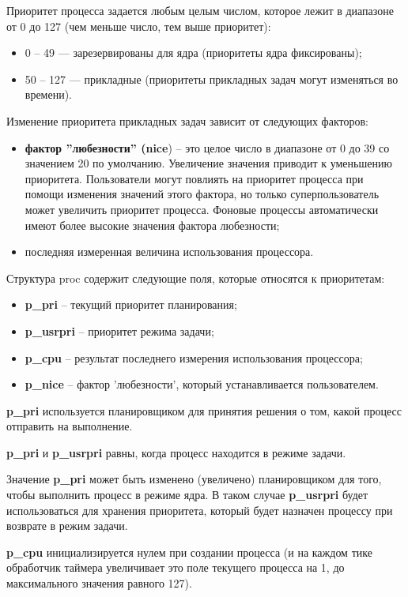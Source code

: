 \documentclass[a4paper,14pt,russian]{extreport}
\begin{document}
	Приоритет процесса задается любым целым числом, которое лежит в диапазоне от 0 до 127 (чем меньше число, тем выше приоритет):
	\begin{itemize}
		\item 0 -- 49 --- зарезервированы для ядра (приоритеты ядра фиксированы);
		\item 50 -- 127 --- прикладные (приоритеты прикладных задач могут изменяться во времени).
	\end{itemize}
	
	Изменение приоритета прикладных задач зависит от следующих факторов:
	\begin{itemize}
		\item \textbf{фактор ”любезности” (nice}) – это целое число в диапазоне от 0 до 39 со значением 20 по умолчанию.
		Увеличение значения приводит к уменьшению приоритета.
		Пользователи могут повлиять на приоритет процесса при помощи изменения значений этого фактора, но только суперпользователь может увеличить приоритет процесса.
		Фоновые процессы автоматически имеют более высокие значения фактора любезности;
		\item последняя измеренная величина использования процессора.
	\end{itemize}

	Структура proc содержит следующие поля, которые относятся к приоритетам:
	\begin{itemize}
		\item \textbf{p\_pri} – текущий приоритет планирования;
		\item \textbf{p\_usrpri} – приоритет режима задачи;
		\item \textbf{p\_cpu} – результат последнего измерения использования процессора;
		\item \textbf{p\_nice} – фактор ’любезности’, который устанавливается пользователем.
	\end{itemize}

	\textbf{p\_pri} используется планировщиком для принятия решения о том, какой процесс отправить на выполнение.
	
	\textbf{p\_pri} и \textbf{p\_usrpri} равны, когда процесс находится в режиме задачи.
	
	Значение \textbf{p\_pri} может быть изменено (увеличено) планировщиком для того, чтобы выполнить процесс в режиме ядра.
	В таком случае \textbf{p\_usrpri} будет использоваться для хранения приоритета, который будет назначен	процессу при возврате в режим задачи.
	
	\textbf{p\_cpu} инициализируется нулем при создании процесса (и на каждом тике обработчик таймера увеличивает это поле текущего процесса на 1, до максимального значения равного 127).
	
\end{document}
